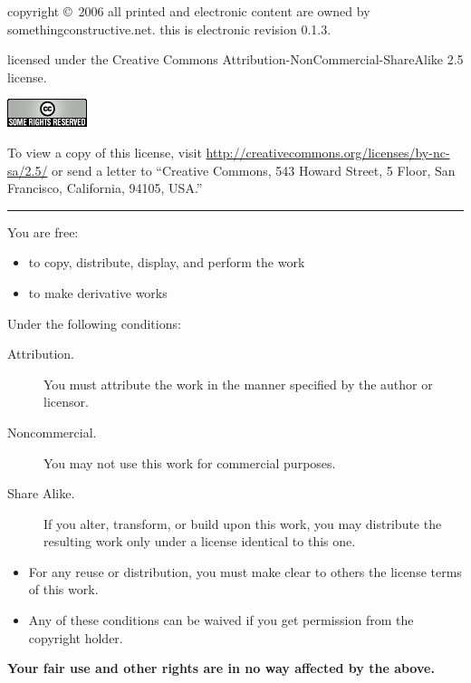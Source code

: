 \begin{center}

  copyright \copyright\ 2006 all printed and electronic content are
  owned by somethingconstructive.net.  this is electronic revision 0.1.3.

  \bigskip

  licensed under the Creative Commons
  Attribution-\-NonCommercial-\-ShareAlike 2.5 license.

  \medskip

  \includegraphics{cc.png}

  \medskip

  To view a copy of this license, visit
  \href{http://creativecommons.org/licenses/by-nc-sa/2.5/}{http://creativecommons.org/licenses/by-nc-sa/2.5/}
  or send a letter to ``Creative Commons, 543 Howard Street,
  5 Floor, San Francisco, California, 94105, USA.''

\rule{4cm}{1pt}

\end{center}

\noindent You are free:

\begin{itemize}
  \item to copy, distribute, display, and perform the work
  \item to make derivative works
\end{itemize}

\noindent Under the following conditions:

\begin{description}

  \item[Attribution.] You must attribute the work in the manner
  specified by the author or licensor.

  \item[Noncommercial.] You may not use this work for commercial purposes.

  \item[Share Alike.] If you alter, transform, or build upon this
  work, you may distribute the resulting work only under a license
  identical to this one.

\end{description}

\begin{itemize}

    \item For any reuse or distribution, you must make clear to others
    the license terms of this work.

    \item Any of these conditions can be waived if you get permission
    from the copyright holder.

\end{itemize}

\noindent\textbf{Your fair use and other rights are in no way affected
by the above.}

\clearpage
